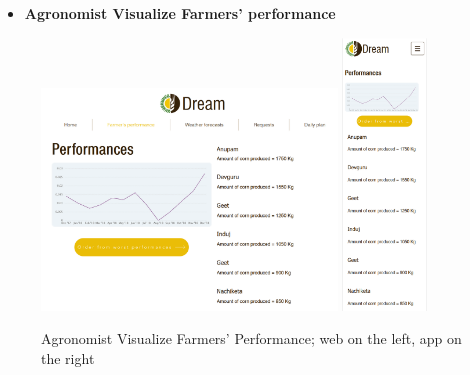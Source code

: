 \documentclass{article}
\begin{document}
    
    \begin{itemize}
        \item \textbf{Agronomist Visualize Farmers' performance}
    \end{itemize}
        \begin{figure} [h]
            \centering
            \includegraphics[width=0.7\textwidth]{images/UserInterfaces/Agronomist/FarmersPerformance/FarmersPerformanceWeb.png}
            \quad
            \includegraphics[width=0.2\textwidth]{images/UserInterfaces/Agronomist/FarmersPerformance/FarmersPerformanceApp.png}
            \quad
            \caption{\label{fig:agronomistFarmersPerformance}Agronomist Visualize Farmers' Performance; web on the left, app on the right}
        \end{figure}
        \newpage
\end{document}
